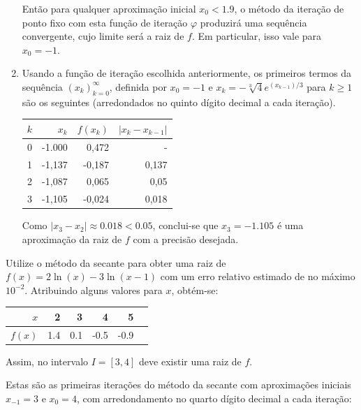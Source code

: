\documentclass[12pt,a4paper]{article}
\begin{document}
\begin{ExerciseList}
\begin{enumerate}
Então para qualquer aproximação inicial $x_0 < 1.9$, o método da iteração de ponto fixo com esta função de iteração $\varphi$ produzirá uma sequência convergente, cujo limite será a raiz de $f$. Em particular, isso vale para $x_0 = -1$.
\item Usando a função de iteração escolhida anteriormente, os primeiros termos da sequência $(x_k)_{k=0}^\infty$, definida por $x_0 = -1$ e $x_k = -\sqrt[3]{4}e^{(x_{k-1})/3}$ para $k \geq 1$ são os seguintes (arredondados no quinto dígito decimal a cada iteração).
\begin{center}
\begin{tabular}{|r|r|r|r|}
\hline
$k$ & $x_k$ & $f(x_k)$ & $|x_k - x_{k-1}|$ \\
\hline
0 & -1.000 & 0,472 & - \\
\hline
1 & -1,137 & -0,187 & 0,137 \\
\hline
2 & -1,087 &  0,065 & 0,05 \\
\hline
3 & -1,105 & -0,024 & 0,018 \\
\hline
\end{tabular}
\end{center}

Como $|x_3 - x_2| \approx 0.018 < 0.05$, conclui-se que $x_3 = -1.105$ é uma aproximação da raiz de $f$ com a precisão desejada.
\end{enumerate}

\Exercise[title={2,5}]
Utilize o método da secante para obter uma raiz de $f(x) = 2\ln(x) - 3\ln(x - 1)$ com um erro relativo estimado de no máximo $10^{-2}$.
\Answer Atribuindo alguns valores para $x$, obtém-se:
\begin{center}
\begin{tabular}{|r|r|r|r|r|r|}
\hline
$x$    & 2   & 3   & 4    &  5 \\
\hline
$f(x)$ & 1.4 & 0.1 & -0.5 & -0.9 \\
\hline
\end{tabular}
\end{center}
Assim, no intervalo $I = [3, 4]$ deve existir uma raiz de $f$.

Estas são as primeiras iterações do método da secante com aproximações iniciais $x_{-1} = 3$ e $x_{0} = 4$, com arredondamento no quarto dígito decimal a cada iteração:


\end{ExerciseList}
\end{document}
